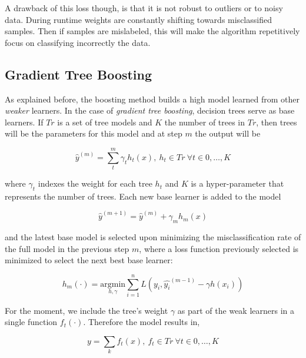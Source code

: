 A drawback of this loss though, is that it is not robust to outliers or to noisy data. During runtime weights are constantly shifting towards misclassified samples. Then if samples are mislabeled, this will make the algorithm repetitively focus on classifying incorrectly the data.



\subsection{Gradient Tree Boosting}

As explained before, the boosting method builds a high model learned from other \textit{weaker} learners. In the case of \textit{gradient tree boosting}, decision trees serve as base learners. If $Tr$ is a set of tree models and $K$ the number of trees in $Tr$, then trees will be the parameters for this model and at step $m$ the output will be

\begin{equation}
\hat{y}^{(m)}= \sum_t^m \gamma_t h_t(x) , \ h_t \in Tr \ \forall t \in {0,\ldots,K}
\end{equation}

where $\gamma_t$ indexes the weight for each tree $h_t$ and $K$ is a hyper-parameter that represents the number of trees. Each new base learner is added to the model

\begin{equation}
\hat{y}^{(m+1)} =  \hat{y}^{(m)} + \gamma_m h_m(x)
\end{equation}

and the latest base model is selected upon minimizing the misclassification rate of the full model in the previous step $m$, where a loss function previously selected is minimized to select the next best base learner:

\begin{equation}
h_m(\cdot) = \underset{h,\gamma}{\mathrm{argmin}}  \sum_{i=1}^{n} L ( y_i, \hat{y_i}^{(m-1)} - \gamma h(x_i) )
\end{equation}


For the moment, we include the tree's weight $\gamma$ as part of the weak learners in a single function $f_t(\cdot)$. Therefore the model results in,

\begin{equation}
y = \sum_k f_t(x) , \ f_t \in Tr \ \forall t \in {0,\ldots,K}
\end{equation}

